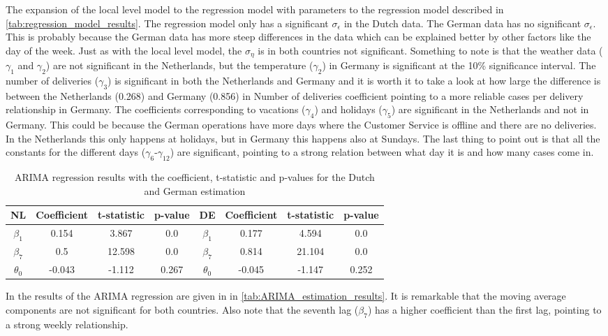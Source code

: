 The expansion of the local level model to the regression model with parameters to the regression model described in \autoref{tab:regression_model_results}. The regression model only has a significant $\sigma_{\epsilon}$ in the Dutch data. The German data has no significant $\sigma_\epsilon$. This is probably because the German data has more steep differences in the data which can be explained better by other factors like the day of the week. Just as with the local level model, the $\sigma_\eta$ is in both countries not significant. Something to note is that the weather data ($\gamma_1$ and $\gamma_2$) are not significant in the Netherlands, but the temperature ($\gamma_2$) in Germany is significant at the 10\% significance interval. The number of deliveries ($\gamma_3$) is significant in both the Netherlands and Germany and it is worth it to take a look at how large the difference is between the Netherlands (0.268) and Germany (0.856) in Number of deliveries coefficient pointing to a more reliable cases per delivery relationship in Germany. The coefficients corresponding to vacations ($\gamma_4$) and holidays ($\gamma_5$) are significant in the Netherlands and not in Germany. This could be because the German operations have more days where the Customer Service is offline and there are no deliveries. In the Netherlands this only happens at holidays, but in Germany this happens also at Sundays. The last thing to point out is that all the constants for the different days ($\gamma_6$-$\gamma_12$) are significant, pointing to a strong relation between what day it is and how many cases come in.\\

\begin{table}[]
    \centering
    \begin{tabular}{|c|c c c||c|c c c|}\hline
        NL & Coefficient & t-statistic & p-value & DE & Coefficient & t-statistic & p-value\\\hline
        $\beta_1$ & 0.154 & 3.867 & 0.0 & $\beta_1$ & 0.177 & 4.594 & 0.0\\
        $\beta_7$ & 0.5 & 12.598 & 0.0 & $\beta_7$ & 0.814 & 21.104 & 0.0\\
        $\theta_0$ & -0.043 & -1.112 & 0.267 & $\theta_0$ & -0.045 & -1.147 & 0.252\\\hline
    \end{tabular}
    \caption{ARIMA regression results with the coefficient, t-statistic and p-values for the Dutch and German estimation}
    \label{tab:ARIMA_estimation_results}
\end{table}
In the results of the ARIMA regression are given in in \autoref{tab:ARIMA_estimation_results}. It is remarkable that the moving average components are not significant for both countries. Also note that the seventh lag ($\beta_7$) has a higher coefficient than the first lag, pointing to a strong weekly relationship.\\

